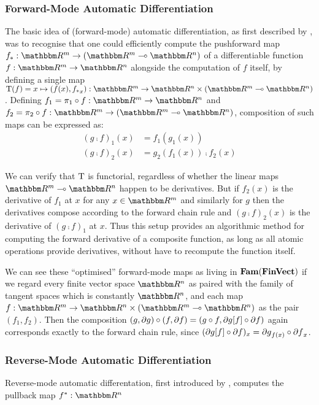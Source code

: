 \subsubsection{Forward-Mode Automatic Differentiation}

The basic idea of (forward-mode) automatic differentiation, as first described by \citet{linnainmaa76}, was to
recognise that one could efficiently compute the pushforward map $\pushf{f}: \RR^m \to (\RR^m \linearto
\RR^n)$ of a differentiable function $f: \RR^m \to \RR^n$ alongside the computation of $f$ itself, by defining
a single map $\tangents(f) = x \mapsto (f(x), \pushf{f}_x): \RR^m \to \RR^n \times (\RR^m \linearto \RR^n)$.
Defining $f_1 = \pi_1 \comp f: \RR^m \to \RR^n$ and $f_2 = \pi_2 \comp f: \RR^m \to (\RR^m \linearto \RR^n)$,
composition of such maps can be expressed as:
\begin{align*}
(g \comp f)_1(x) &= f_1(g_1(x)) \\
(g \comp f)_2(x) &= g_2(f_1(x)) \comp f_2(x)
\end{align*}

We can verify that $\mathrm{T}$ is functorial, regardless of whether the linear maps $\RR^m \linearto \RR^n$
happen to be derivatives. But if $f_2(x)$ is the derivative of $f_1$ at $x$ for any $x \in \RR^m$ and
similarly for $g$ then the derivatives compose according to the forward chain rule and $(g \comp f)_2(x)$ is
the derivative of $(g \comp f)_1$ at $x$. Thus this setup provides an algorithmic method for computing the
forward derivative of a composite function, as long as all atomic operations provide derivatives, without have
to recompute the function itself.


We can see these ``optimised'' forward-mode maps as living in $\mathbf{Fam}(\mathbf{FinVect})$ if we regard every finite
vector space $\RR^n$ as paired with the family of tangent spaces which is constantly $\RR^n$, and each map $f:
\RR^m \to \RR^n \times (\RR^m \linearto \RR^n)$ as the pair $(f_1, f_2)$. Then the composition $(g, \partial
g) \circ (f, \partial f) = (g \circ f, \partial g[f] \circ \partial f)$ again corresponds exactly to
the forward chain rule, since $(\partial g[f] \circ \partial f)_x = {\partial g}_{f(x)} \circ
{\partial f}_x$.

\subsubsection{Reverse-Mode Automatic Differentiation}

Reverse-mode automatic differentation, first introduced by \citet{griewank89}, computes the pullback map
$\pullf{f}: \RR^n$

